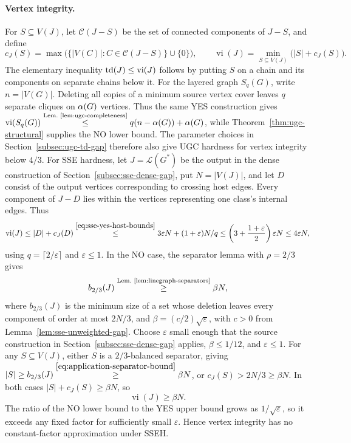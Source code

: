 \paragraph{Vertex integrity.}
For $S\subseteq V(J)$, let $\mathcal C(J-S)$ be the set of connected
components of $J-S$, and define
\[
c_J(S)=\max\bigl(\{|V(C)|:C\in\mathcal C(J-S)\}\cup\{0\}\bigr),\qquad \operatorname{vi}(J)=\min_{S\subseteq V(J)}\bigl(|S|+c_J(S)\bigr).
\]
The elementary inequality
$\operatorname{td}(J)\leq\operatorname{vi}(J)$ follows by putting $S$ on a chain
and its components on separate chains below it. For the layered graph
$S_q(G)$, write $n=|V(G)|$. Deleting all copies of a minimum source
vertex cover leaves $q$ separate
cliques on $\alpha(G)$ vertices. Thus the same YES construction gives
$\operatorname{vi}(S_q(G))\overset{\text{Lem.~\ref{lem:ugc-completeness}}}{\leq}
q(n-\alpha(G))+\alpha(G)$,
while Theorem~\ref{thm:ugc-structural} supplies the NO lower bound.
The parameter choices in Section~\ref{subsec:ugc-td-gap} therefore
also give UGC hardness for vertex integrity below $4/3$.
For SSE hardness, let $J=\mathcal L(G^*)$ be the output in the
dense construction of Section~\ref{subsec:sse-dense-gap}, put
$N=|V(J)|$, and let $D$ consist of the output vertices corresponding
to crossing host edges. Every component of $J-D$ lies within the
vertices representing one class's internal edges. Thus
\begin{equation}\label{eq:integrity-sse-yes}
\operatorname{vi}(J)\leq |D|+c_J(D)
 \overset{\eqref{eq:sse-yes-host-bounds}}{\leq}
       3\varepsilon N+(1+\varepsilon)N/q \leq\left(3+\frac{1+\varepsilon}{2}\right)
      \varepsilon N
  \leq4\varepsilon N,
\end{equation}
using $q=\lceil2/\varepsilon\rceil$ and $\varepsilon\le1$.
In the NO case, the separator
lemma with $\rho=2/3$ gives
\begin{equation}\label{eq:application-separator-bound}
 b_{2/3}(J)\overset{\text{Lem.~\ref{lem:linegraph-separators}}}{\geq}\beta N,
\end{equation}
where
$b_{2/3}(J)$ is the minimum size of a set whose deletion leaves every
component of order at most $2N/3$, and
$\beta=(c/2)\sqrt\varepsilon$, with $c>0$ from
Lemma~\ref{lem:sse-unweighted-gap}. Choose $\varepsilon$ small enough
that the source construction in
Section~\ref{subsec:sse-dense-gap} applies, $\beta\leq1/12$, and
$\varepsilon\leq1$. For any $S\subseteq V(J)$, either $S$ is a
$2/3$-balanced separator, giving
$|S|\geq b_{2/3}(J)\overset{\eqref{eq:application-separator-bound}}{\geq}\beta N$, or
$c_J(S)>2N/3\geq\beta N$. In both cases
$|S|+c_J(S)\geq\beta N$, so
\begin{equation}\label{eq:integrity-sse-no}
 \operatorname{vi}(J)\geq\beta N.
\end{equation}
The ratio of the NO lower bound to the YES upper bound grows as
$1/\sqrt\varepsilon$, so it exceeds any fixed factor for sufficiently
small $\varepsilon$. Hence vertex integrity has no constant-factor
approximation under SSEH.

